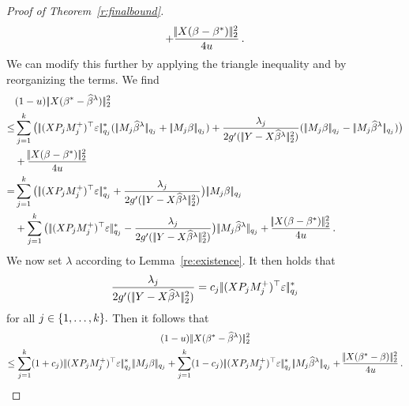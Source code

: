 \documentclass[bj]{imsart}
\newcommand{\normtwo}[1]{\ensuremath{\!|\!| #1 | \! |_{2}}}
\newcommand{\normqj}[1]{\ensuremath{\!|\!| #1 | \! |_{q_j}}}
\newcommand{\normqjd}[1]{\ensuremath{\!|\!| #1 | \! |_{q_j}^*}}
\newcommand{\1}{{\rm 1}\mskip -4,5mu{\rm l} }
\newcommand{\est}{\widehat\beta}
\newcommand{\betatrue}{\beta^*}
\newcommand{\lo}{\overline{\lambda}}
\newcommand{\genbeta}{\textcolor{black}{\beta}}
\newcommand{\genconstant}{\textcolor{black}{\ensuremath{u}}}
\begin{document}
\begin{proof}[Proof of Theorem~\ref{r:finalbound}]
\begin{multline*}
+\frac{\normtwo{\design(\genbeta-\betatrue)}^2}{4\genconstant}\,.
\end{multline*}
We can modify this further by applying the triangle inequality and by reorganizing the terms. We find
\begin{align*}
&(1-\genconstant)\,\normtwo{\design(\betatrue-\estimatort)}^2 \\ 
\le & \sum_{j=1}^\numbergroups\big(\,\normqjd{(\design  \projectionmatrix_j \fusedmatrix_j^{+})^\top\noise}(\,\normqj{\fusedmatrix_j\estimatort}+\,\normqj{\fusedmatrix_j \genbeta})+\frac{\lambda_j}{2g'(\,\normtwo{\outcome-\design\estimatort}^2)}(\,\normqj{\fusedmatrix_j \genbeta}-\,\normqj{\fusedmatrix_j\estimatort})\big)\\
&+\frac{\normtwo{\design(\genbeta-\betatrue)}^2}{4\genconstant}\\
=& \sum_{j=1}^\numbergroups\big(\,\normqjd{(\design  \projectionmatrix_j \fusedmatrix_j^{+})^\top\noise}+\frac{\lambda_j}{2g'(\,\normtwo{\outcome-\design\estimatort}^2)}\big)\,\normqj{\fusedmatrix_j \genbeta}\\
& +\sum_{j=1}^\numbergroups\big(\,\normqjd{(\design \projectionmatrix_j \fusedmatrix_j^{+})^\top\noise}-\frac{\lambda_j}{2g'(\,\normtwo{\outcome-\design\estimatort}^2)}\big)\,\normqj{\fusedmatrix_j\estimatort}+\frac{\normtwo{\design(\genbeta-\betatrue)}^2}{4\genconstant}\,.
\end{align*}
We now set $\lambda$ according to Lemma~\ref{re:existence}. It then holds that\begin{align*}
\frac{\lambda_j}{2g'(\,\normtwo{\outcome-\design\estimatort}^2)}= \tuningrelax_j\,\normqjd{(\design  \projectionmatrix_j\fusedmatrix_j^{+})^\top\noise}
\end{align*}
 for all $j\in\{1,\dots,k\}.$
 Then it follows that
 \begin{multline*}
(1-\genconstant)\,\normtwo{\design(\betatrue-\estimatort)}^2\\
 \le \sum_{j=1}^{\numbergroups}(1+\tuningrelax_j)\, \normqjd{(\design  \projectionmatrix_j\fusedmatrix_j^{+})^\top\noise} \,  \normqj{\fusedmatrix_j \genbeta}+\sum_{j=1}^{\numbergroups}(1-\tuningrelax_j)\, \normqjd{(\design  \projectionmatrix_j\fusedmatrix_j^{+})^\top\noise} \,  \normqj{\fusedmatrix_j \estimatort}+\frac{\normtwo{\design(\betatrue-\genbeta)}^2}{4\genconstant}\,.

\end{multline*}
\end{proof}
\end{document}

